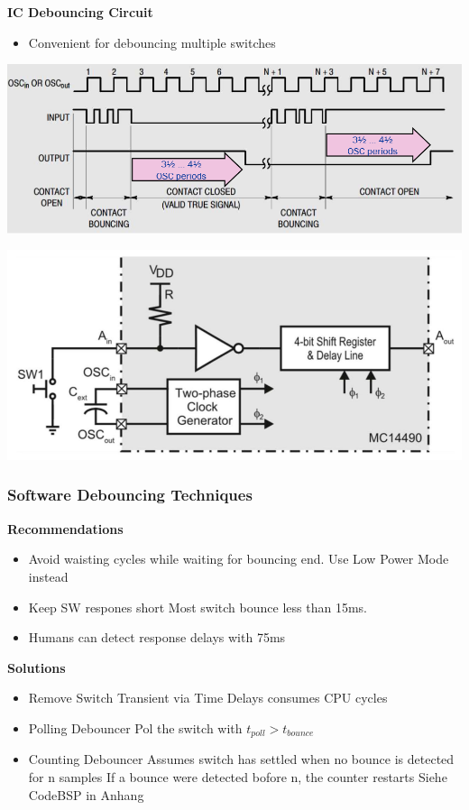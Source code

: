 \textbf{IC Debouncing Circuit}\newline
\begin{minipage}{0.5\linewidth}
    \begin{itemize}
        \item Convenient for debouncing multiple switches
    \end{itemize}
    \includegraphics[width=0.8\linewidth]{images/HWDebounceICTiming}  
\end{minipage}
\begin{minipage}{0.5\linewidth}
    \includegraphics[width=0.9\linewidth]{images/HWDebounceIC}  
\end{minipage}
\subsubsection{Software Debouncing Techniques }
\begin{multicols}{2}
\textbf{Recommendations}
\begin{itemize}
    \item Avoid waisting cycles while waiting for bouncing end.
        \subitem Use Low Power Mode instead
    \item Keep SW respones short
        \subitem Most switch bounce less than 15ms.
    \item Humans can detect response delays with 75ms
\end{itemize}
\columnbreak
\textbf{Solutions}
\begin{itemize}
    \item Remove Switch Transient via Time Delays
        \subitem consumes \acs{CPU} cycles
    \item Polling Debouncer
        \subitem Pol the switch with $ t_{poll} > t_{bounce} $
    \item Counting Debouncer
        \subitem Assumes switch has settled when no bounce is detected for n samples
        \subitem If a bounce were detected bofore n, the counter restarts 
        \subitem Siehe CodeBSP in Anhang \label{CountingDebouncer}     
\end{itemize}
\end{multicols}
